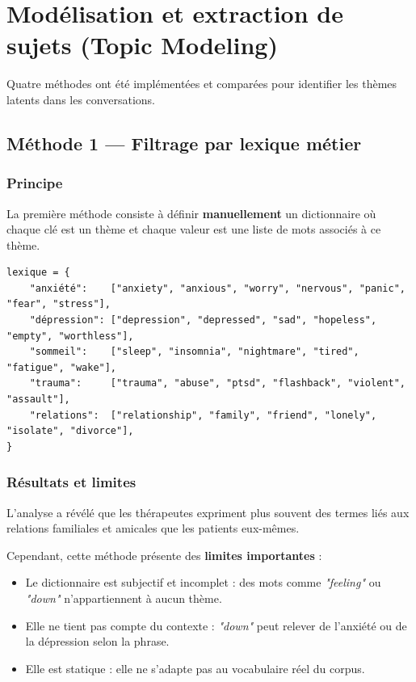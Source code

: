\documentclass[12pt,a4paper]{article}
\begin{document}
\pagebreak

\section{Modélisation et extraction de sujets (Topic Modeling)}

Quatre méthodes ont été implémentées et comparées pour identifier les thèmes latents dans
les conversations.

\subsection{Méthode 1 — Filtrage par lexique métier}
\subsubsection{Principe}

La première méthode consiste à définir \textbf{manuellement} un dictionnaire où chaque clé est un
thème et chaque valeur est une liste de mots associés à ce thème.

\vspace{10px}

\begin{lstlisting}
lexique = {
    "anxiété":    ["anxiety", "anxious", "worry", "nervous", "panic", "fear", "stress"],
    "dépression": ["depression", "depressed", "sad", "hopeless", "empty", "worthless"],
    "sommeil":    ["sleep", "insomnia", "nightmare", "tired", "fatigue", "wake"],
    "trauma":     ["trauma", "abuse", "ptsd", "flashback", "violent", "assault"],
    "relations":  ["relationship", "family", "friend", "lonely", "isolate", "divorce"],
}
\end{lstlisting}

\subsubsection{Résultats et limites}

L'analyse a révélé que les thérapeutes expriment plus souvent des termes liés aux relations
familiales et amicales que les patients eux-mêmes.

Cependant, cette méthode présente des \textbf{limites importantes} :
\begin{itemize}
  \item Le dictionnaire est subjectif et incomplet : des mots comme \textit{"feeling"} ou
        \textit{"down"} n'appartiennent à aucun thème.
  \item Elle ne tient pas compte du contexte : \textit{"down"} peut relever de l'anxiété ou
        de la dépression selon la phrase.
  \item Elle est statique : elle ne s'adapte pas au vocabulaire réel du corpus.
\end{itemize}
\end{document}
